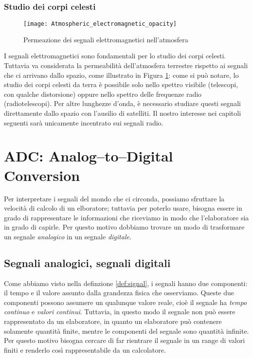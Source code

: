 \subsubsection{Studio dei corpi celesti}
\begin{figure}[htb]
	\begin{center}
		\texttt{[image: Atmospheric\_electromagnetic\_opacity]}
	\end{center}
	\caption{Permeazione dei segnali elettromagnetici nell'atmosfera}
	\label{fig:atm_em_op}
\end{figure}
I segnali elettromagnetici sono fondamentali per lo studio dei corpi celesti.
Tuttavia va considerata la permeabilit\`a dell'atmosfera terrestre rispetto ai
segnali che ci arrivano dallo spazio, come illustrato in Figura
\ref{fig:atm_em_op}: come si pu\`o notare, lo studio dei corpi celesti da terra
\`e possibile solo nello spettro visibile (telescopi, con qualche distorsione)
oppure nello spettro delle frequenze radio (radiotelescopi). Per altre lunghezze
d'onda, \`e necessario studiare questi segnali direttamente dallo spazio con
l'ausilio di satelliti. Il nostro interesse nei capitoli seguenti sar\`a
unicamente incentrato sui segnali radio.

\section{ADC: Analog--to--Digital Conversion}
Per interpretare i segnali del mondo che ci circonda, possiamo sfruttare la
velocit\`a di calcolo di un elboratore; tuttavia per poterlo usare, bisogna
essere in grado di rappresentare le informazioni che riceviamo in modo che
l'elaboratore sia in grado di capirle. Per questo motivo dobbiamo trovare un
modo di trasformare un segnale \emph{analogico} in un segnale \emph{digitale}.

\subsection{Segnali analogici, segnali digitali}
Come abbiamo visto nella definzione \ref{def:signal}, i segnali hanno due
componenti: il tempo e il valore assunto dalla grandezza fisica che osserviamo.
Queste due componenti possono assumere un qualunque valore reale, cio\`e il
segnale ha \emph{tempo continuo} e \emph{valori continui}. Tuttavia, in questo
modo il segnale non pu\`o essere rappresentato da un elaboratore, in quanto un
elaboratore pu\`o contenere solamente quantit\`a finite, mentre le componenti
del segnale sono quantit\`a infinite. Per questo motivo bisogna cercare di far
rientrare il segnale in un range di valori finiti e renderlo cos\`i
rappresentabile da un calcolatore.

